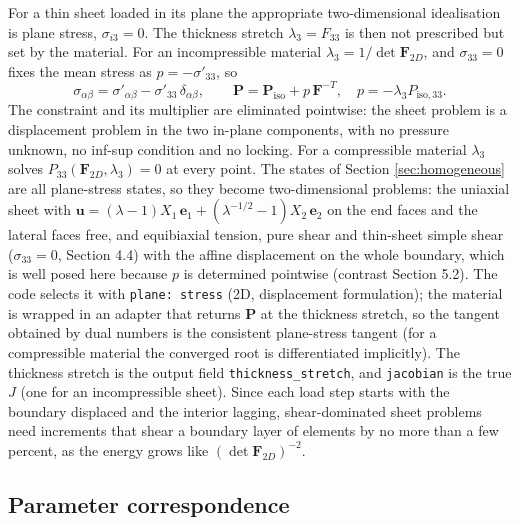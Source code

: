 \documentclass[11pt]{article}
\newcommand{\bu}{\bm{u}}
\newcommand{\be}{\bm{e}}
\newcommand{\bP}{\bm{P}}
\newcommand{\bF}{\bm{F}}
\newcommand{\code}[1]{{\frenchspacing\texttt{#1}}}
\begin{document}
For a thin sheet loaded in its plane the appropriate two-dimensional
idealisation is plane stress, $\sigma_{i3} = 0$.  The thickness stretch
$\lambda_3 = F_{33}$ is then not prescribed but set by the material.  For an
incompressible material $\lambda_3 = 1/\det\bF_{2D}$, and $\sigma_{33} = 0$
fixes the mean stress as $p = -\sigma'_{33}$, so
\begin{equation}
  \sigma_{\alpha\beta} = \sigma'_{\alpha\beta} - \sigma'_{33}\,\delta_{\alpha\beta},
  \qquad
  \bP = \bP_{\mathrm{iso}} + p\,\bF^{-T}, \quad p = -\lambda_3 P_{\mathrm{iso},33} .
\end{equation}
The constraint and its multiplier are eliminated pointwise: the sheet
problem is a displacement problem in the two in-plane components, with no
pressure unknown, no inf-sup condition and no locking.  For a compressible
material $\lambda_3$ solves $P_{33}(\bF_{2D}, \lambda_3) = 0$ at every point.
The states of Section \ref{sec:homogeneous} are all plane-stress states, so
they become two-dimensional problems: the uniaxial sheet with
$\bu = (\lambda - 1)X_1\,\be_1 + (\lambda^{-1/2} - 1)X_2\,\be_2$ on the end
faces and the lateral faces free, and equibiaxial tension, pure shear and
thin-sheet simple shear ($\sigma_{33} = 0$, Section 4.4) with the affine
displacement on the whole boundary, which is well posed here because $p$
is determined pointwise (contrast Section 5.2).  The code selects it with
\code{plane: stress} (2D, displacement formulation); the material is
wrapped in an adapter that returns $\bP$ at the thickness stretch, so the
tangent obtained by dual numbers is the consistent plane-stress tangent
(for a compressible material the converged root is differentiated
implicitly).  The thickness stretch is the output field
\code{thickness\_stretch}, and \code{jacobian} is the true $J$ (one for an
incompressible sheet).  Since each load step starts with the boundary
displaced and the interior lagging, shear-dominated sheet problems need
increments that shear a boundary layer of elements by no more than a few
percent, as the energy grows like $(\det\bF_{2D})^{-2}$.

\subsection{Parameter correspondence}
\end{document}
